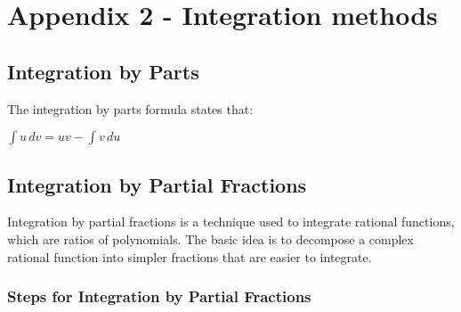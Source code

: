 \chapter{Appendix 2 - Integration methods}

\section{Integration by Parts}

The integration by parts formula states that:

$ \int u \, dv = uv - \int v \, du $

\section{Integration by Partial Fractions}

Integration by partial fractions is a technique used to integrate rational functions, which are ratios of polynomials. The basic idea is to decompose a complex rational function into simpler fractions that are easier to integrate.

\subsection{Steps for Integration by Partial Fractions}

